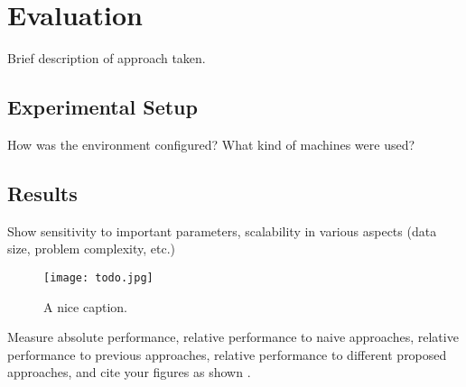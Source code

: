 \section{Evaluation}
\label{sec:eval}
Brief description of approach taken.

\subsection{Experimental Setup}
How was the environment configured?
What kind of machines were used?

\subsection{Results}
Show sensitivity to important parameters, scalability in various aspects (data
size, problem complexity, etc.)

\begin{figure*}[h!]
  \centering
  \texttt{[image: todo.jpg]}
  \caption{A nice caption.}
  \label{fig:todo}
\end{figure*}

Measure absolute performance, relative performance to naive approaches,
relative performance to previous approaches, relative performance to different
proposed approaches, and cite your figures as shown .